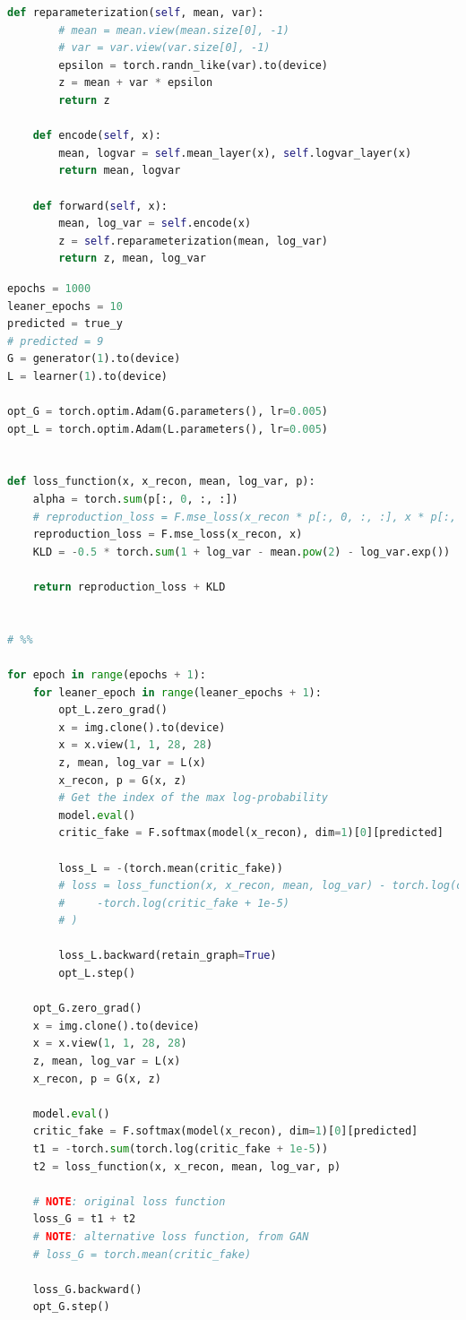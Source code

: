 \documentclass[12pt]{article}
\begin{document}
\begin{lstlisting}[language=Python, caption= GAN and VAE model]
    def reparameterization(self, mean, var):
        # mean = mean.view(mean.size[0], -1)
        # var = var.view(var.size[0], -1)
        epsilon = torch.randn_like(var).to(device)
        z = mean + var * epsilon
        return z

    def encode(self, x):
        mean, logvar = self.mean_layer(x), self.logvar_layer(x)
        return mean, logvar

    def forward(self, x):
        mean, log_var = self.encode(x)
        z = self.reparameterization(mean, log_var)
        return z, mean, log_var

\end{lstlisting}

\begin{lstlisting}[language=Python, caption= GAN and VAE loss function]
epochs = 1000
leaner_epochs = 10
predicted = true_y
# predicted = 9
G = generator(1).to(device)
L = learner(1).to(device)

opt_G = torch.optim.Adam(G.parameters(), lr=0.005)
opt_L = torch.optim.Adam(L.parameters(), lr=0.005)


def loss_function(x, x_recon, mean, log_var, p):
    alpha = torch.sum(p[:, 0, :, :])
    # reproduction_loss = F.mse_loss(x_recon * p[:, 0, :, :], x * p[:, 0, :, :])
    reproduction_loss = F.mse_loss(x_recon, x)
    KLD = -0.5 * torch.sum(1 + log_var - mean.pow(2) - log_var.exp())

    return reproduction_loss + KLD


# %%

for epoch in range(epochs + 1):
    for leaner_epoch in range(leaner_epochs + 1):
        opt_L.zero_grad()
        x = img.clone().to(device)
        x = x.view(1, 1, 28, 28)
        z, mean, log_var = L(x)
        x_recon, p = G(x, z)
        # Get the index of the max log-probability
        model.eval()
        critic_fake = F.softmax(model(x_recon), dim=1)[0][predicted]

        loss_L = -(torch.mean(critic_fake))
        # loss = loss_function(x, x_recon, mean, log_var) - torch.log(critic_real + 1e-5) * (
        #     -torch.log(critic_fake + 1e-5)
        # )

        loss_L.backward(retain_graph=True)
        opt_L.step()

    opt_G.zero_grad()
    x = img.clone().to(device)
    x = x.view(1, 1, 28, 28)
    z, mean, log_var = L(x)
    x_recon, p = G(x, z)

    model.eval()
    critic_fake = F.softmax(model(x_recon), dim=1)[0][predicted]
    t1 = -torch.sum(torch.log(critic_fake + 1e-5))
    t2 = loss_function(x, x_recon, mean, log_var, p)

    # NOTE: original loss function
    loss_G = t1 + t2
    # NOTE: alternative loss function, from GAN
    # loss_G = torch.mean(critic_fake)

    loss_G.backward()
    opt_G.step()
\end{lstlisting}
\end{document}
